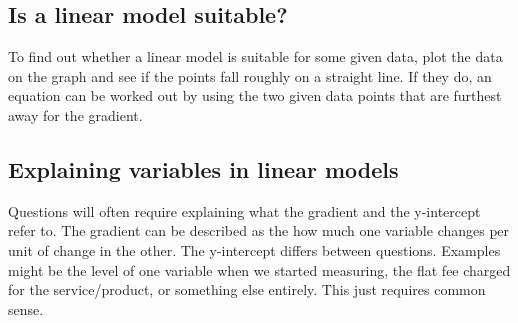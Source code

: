 \subsection{Is a linear model suitable?}
To find out whether a linear model is suitable for some given data, plot the data on the graph and see if the points fall roughly  on a straight line. If they do, an equation can be worked out by using the two given data points that are furthest away for the gradient.

\subsection{Explaining variables in linear models}
Questions will often require explaining what the gradient and the y-intercept refer to. The gradient can be described as the how much one variable changes \b{per} unit of change in the other. The y-intercept differs between questions. Examples might be the level of one variable when we started measuring, the flat fee charged for the service/product, or something else entirely. This just requires common sense.
